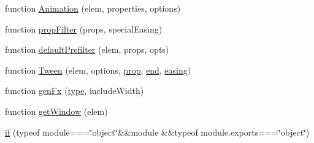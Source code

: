 \begin{DoxyCompactItemize}
function \hyperlink{jquery-1_810_82_8js_aa33f7dcb8ee41587d545a0bc69849296}{Animation} (elem, properties, options)
\item 
function \hyperlink{jquery-1_810_82_8js_a0196d1f08ae60b747901b5a2950f72f1}{prop\-Filter} (props, special\-Easing)
\item 
function \hyperlink{jquery-1_810_82_8js_a8041b1040535dcee84ad474aaaf11dde}{default\-Prefilter} (elem, props, opts)
\item 
function \hyperlink{jquery-1_810_82_8js_adcb517ce3709049d37bb5f5bd3811edf}{Tween} (elem, options, \hyperlink{jquery-1_810_82-vsdoc_8js_af17be84954030af6c2286f5da385d41b}{prop}, \hyperlink{jquery-1_810_82-vsdoc_8js_af2ce7c86b4e6e9d61f85745258f4ef32}{end}, \hyperlink{jquery-1_810_82_8js_a9758a312629fa6de1744280dd6e6253b}{easing})
\item 
function \hyperlink{jquery-1_810_82_8js_a0dad9ae6c57fd32a071de202faa87081}{gen\-Fx} (\hyperlink{jquery-1_810_82-vsdoc_8js_a3940565e83a9bfd10d95ffd27536da91}{type}, include\-Width)
\item 
function \hyperlink{jquery-1_810_82_8js_ab8e6e1fb3b8b51b6afe437c63df0e09f}{get\-Window} (elem)
\item 
\hyperlink{jquery-1_810_82_8js_aa2cebb51f03a2e3ab2af45a3f9241c96}{if} (typeof module===\char`\"{}object\char`\"{}\&\&module \&\&typeof module.\-exports===\char`\"{}object\char`\"{})
\end{DoxyCompactItemize}
